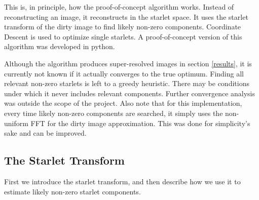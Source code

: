 This is, in principle, how the proof-of-concept algorithm works. Instead of reconstructing an image, it reconstructs in the starlet space. It uses the starlet transform of the dirty image to find likely non-zero components. Coordinate Descent is used to optimize single starlets. A proof-of-concept version of this algorithm was developed in python.

Although the algorithm produces super-resolved images in section \ref{results}, it is currently not known if it actually converges to the true optimum. Finding all relevant non-zero starlets is left to a greedy heuristic. There may be conditions under which it never includes relevant components. Further convergence analysis was outside the scope of the project. Also note that for this implementation, every time likely non-zero components are searched, it simply uses the non-uniform FFT for the dirty image approximation. This was done for simplicity's sake and can be improved.


\subsection{The Starlet Transform} \label{cd:starlets}
First we introduce the starlet transform, and then describe how we use it to estimate likely non-zero starlet components.

